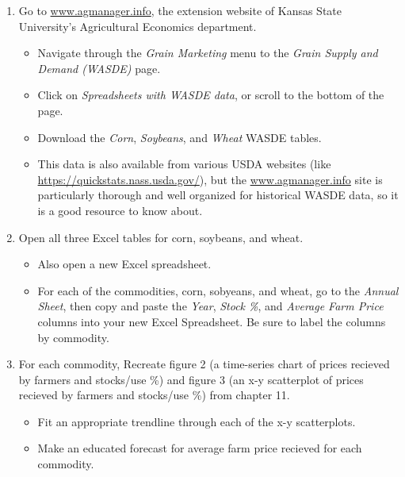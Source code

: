 \documentclass[
  letterpaper,
  DIV=11,
  numbers=noendperiod]{scrreprt}
\begin{document}
\begin{enumerate}
\def\labelenumi{\arabic{enumi}.}
\item
  Go to \url{www.agmanager.info}, the extension website of Kansas State
  University's Agricultural Economics department.

  \begin{itemize}
  \item
    Navigate through the \emph{Grain Marketing} menu to the \emph{Grain
    Supply and Demand (WASDE)} page.
  \item
    Click on \emph{Spreadsheets with WASDE data}, or scroll to the
    bottom of the page.
  \item
    Download the \emph{Corn}, \emph{Soybeans}, and \emph{Wheat} WASDE
    tables.
  \item
    This data is also available from various USDA websites (like
    \url{https://quickstats.nass.usda.gov/}), but the
    \href{agmanager.info}{www.agmanager.info} site is particularly
    thorough and well organized for historical WASDE data, so it is a
    good resource to know about.
  \end{itemize}
\item
  Open all three Excel tables for corn, soybeans, and wheat.

  \begin{itemize}
  \item
    Also open a new Excel spreadsheet.
  \item
    For each of the commodities, corn, sobyeans, and wheat, go to the
    \emph{Annual Sheet}, then copy and paste the \emph{Year},
    \emph{Stock \%}, and \emph{Average Farm Price} columns into your new
    Excel Spreadsheet. Be sure to label the columns by commodity.
  \end{itemize}
\item
  For each commodity, Recreate figure 2 (a time-series chart of prices
  recieved by farmers and stocks/use \%) and figure 3 (an x-y
  scatterplot of prices recieved by farmers and stocks/use \%) from
  chapter 11.

  \begin{itemize}
  \item
    Fit an appropriate trendline through each of the x-y scatterplots.
  \item
    Make an educated forecast for average farm price recieved for each
    commodity.
  \end{itemize}
\end{enumerate}
\end{document}
